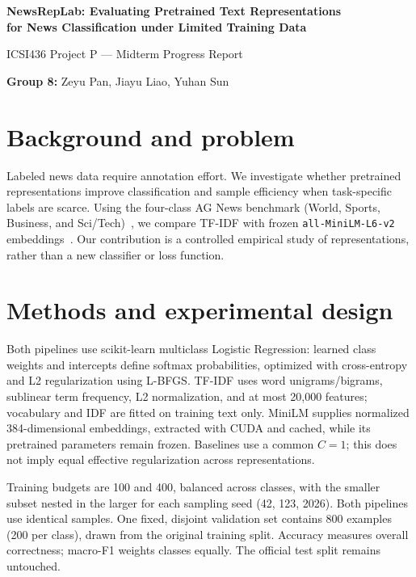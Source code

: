 \documentclass[10pt,letterpaper]{article}
\begin{document}
\begin{center}
{\large\bfseries NewsRepLab: Evaluating Pretrained Text Representations\\
for News Classification under Limited Training Data}\par
\vspace{3pt}
ICSI436 Project P --- Midterm Progress Report\par
\textbf{Group 8:} Zeyu Pan, Jiayu Liao, Yuhan Sun
\end{center}
\vspace{-5pt}
\section{Background and problem}
Labeled news data require annotation effort. We investigate whether pretrained representations improve classification and sample efficiency when task-specific labels are scarce. Using the four-class AG News benchmark (World, Sports, Business, and Sci/Tech)~\cite{agnews}, we compare TF-IDF with frozen \texttt{all-MiniLM-L6-v2} embeddings~\cite{minilm}. Our contribution is a controlled empirical study of representations, rather than a new classifier or loss function.

\section{Methods and experimental design}
Both pipelines use scikit-learn multiclass Logistic Regression: learned class weights and intercepts define softmax probabilities, optimized with cross-entropy and L2 regularization using L-BFGS. TF-IDF uses word unigrams/bigrams, sublinear term frequency, L2 normalization, and at most 20,000 features; vocabulary and IDF are fitted on training text only. MiniLM supplies normalized 384-dimensional embeddings, extracted with CUDA and cached, while its pretrained parameters remain frozen. Baselines use a common $C=1$; this does not imply equal effective regularization across representations.

Training budgets are 100 and 400, balanced across classes, with the smaller subset nested in the larger for each sampling seed (42, 123, 2026). Both pipelines use identical samples. One fixed, disjoint validation set contains 800 examples (200 per class), drawn from the original training split. Accuracy measures overall correctness; macro-F1 weights classes equally. The official test split remains untouched.
\end{document}
